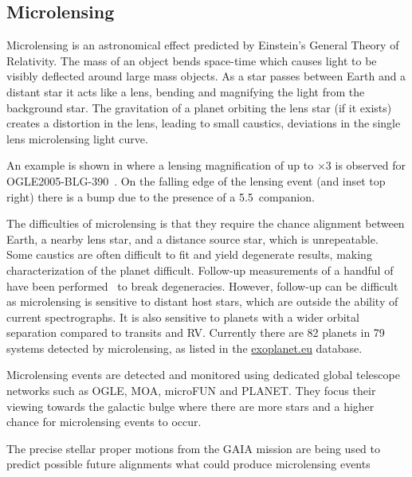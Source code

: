\subsection{Microlensing}
\label{sub:microlensing}
Microlensing is an astronomical effect predicted by Einstein's General Theory of Relativity.
The mass of an object bends space-time which causes light to be visibly deflected around large mass objects.
As a star passes between Earth and a distant star it acts like a lens, bending and magnifying the light from the background star.
The gravitation of a planet orbiting the lens star (if it exists) creates a distortion in the lens, leading to small caustics, deviations in the single lens microlensing light curve.

An example is shown in  where a lensing magnification of up to $\times3$ is observed for {OGLE2005-BLG-390}~\citep{beaulieu_discovery_2006}.
On the falling edge of the lensing event (and inset top right) there is a bump due to the presence of a 5.5\,\Mjup{} companion.

The difficulties of microlensing is that they require the chance alignment between Earth, a nearby lens star, and a distance source star, which is unrepeatable.
Some caustics are often difficult to fit and yield degenerate results, making characterization of the planet difficult.
Follow-up measurements of a handful of have been performed~\citep[e.g.][]{kubas_frozen_2012, batista_confirmation_2015, santerne_spectroscopic_2016} to break degeneracies.
However, follow-up can be difficult as microlensing is sensitive to distant host stars, which are outside the ability of current spectrographs.
It is also sensitive to planets with a wider orbital separation compared to transits and {RV}.
Currently there are 82 planets in 79 systems detected by microlensing, as listed in the \href{https:\\www.exoplanet.eu}{exoplanet.eu} database.

Microlensing events are detected and monitored using dedicated global telescope networks such as {OGLE}, {MOA}, {microFUN} and {PLANET}.
They focus their viewing towards the galactic bulge where there are more stars and a higher chance for microlensing events to occur.

The precise stellar proper motions from the GAIA mission are being used to predict possible future alignments what could produce microlensing events~\citep{kluter_prediction_2018}

